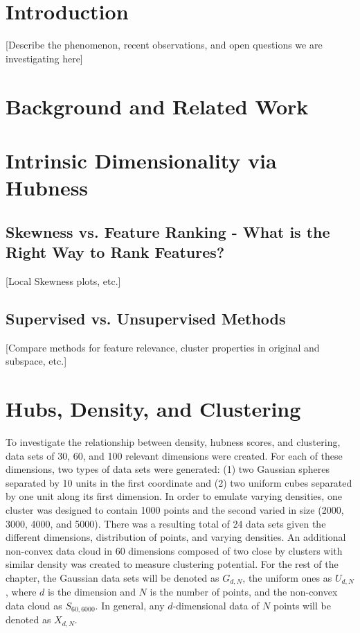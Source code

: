 \documentclass[graybox]{svmult}
\begin{document}
\section{Introduction}
\label{sec:1}
[Describe the phenomenon, recent observations, and open questions we are investigating here]



\section{Background and Related Work}
\label{sec:2}



\section{Intrinsic Dimensionality via Hubness}
\label{sec:3}

\subsection{Skewness vs. Feature Ranking - What is the Right Way to Rank Features? }
\label{subsec:3.1}
[Local Skewness plots, etc.]

\subsection{Supervised vs. Unsupervised Methods }
\label{subsec:3.2}
[Compare methods for feature relevance, cluster properties in original and subspace, etc.]


\section{Hubs, Density, and Clustering}
\label{sec:4}

To investigate the relationship between density, hubness scores, and clustering, data sets of 30, 60, and 100 relevant dimensions were created. For each of these dimensions, two types of data sets were generated: (1) two Gaussian spheres separated by 10 units in the first coordinate and (2) two uniform cubes separated by one unit along its first dimension. In order to emulate varying densities, one cluster was designed to contain 1000 points and the second varied in size (2000, 3000, 4000, and 5000). There was a resulting total of 24 data sets given the different dimensions, distribution of points, and varying densities. An additional non-convex data cloud in 60 dimensions composed of two close by clusters with similar density was created to measure clustering potential. For the rest of the chapter, the Gaussian data sets will be denoted as $G_{d,N}$, the uniform ones as $U_{d,N}$, where $d$ is the dimension and $N$ is the number of points, and the non-convex data cloud as $S_{60,6000}$. In general, any $d$-dimensional data of $N$ points will be denoted as $X_{d,N}$.
\end{document}
